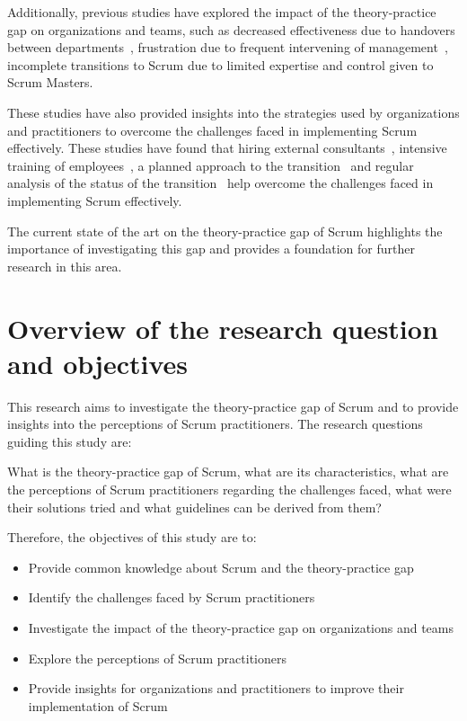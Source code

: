 Additionally, previous studies have explored the impact of the theory-practice gap on organizations and teams, such as decreased effectiveness due to handovers between departments~\cite[p.~119]{Vilkki2010Wai}, frustration due to frequent intervening of management~\cite[p.~29]{Koning2019AT}, incomplete \glspl{transition} to Scrum due to limited expertise and control given to Scrum Masters.

These studies have also provided insights into the strategies used by organizations and practitioners to overcome the challenges faced in implementing Scrum effectively. These studies have found that hiring external consultants~\cite[p.~77]{Moreira2013AtA}, intensive training of employees~\cite[p.~72]{Maximini2018ISi}, a planned approach to the \gls{transition}~\cite[p.~37]{Thorgren2019Tro} and regular analysis of the status of the \gls{transition}~\cite[p.~395]{Rubin2012ESA} help overcome the challenges faced in implementing Scrum effectively. 

The current state of the art on the theory-practice gap of Scrum highlights the importance of investigating this gap and provides a foundation for further research in this area.

\section{Overview of the research question and objectives}\label{sec:OverviewResearchQuestion}
This research aims to investigate the theory-practice gap of Scrum and to provide insights into the perceptions of Scrum practitioners. The research questions guiding this study are: 

What is the theory-practice gap of Scrum, what are its characteristics, what are the perceptions of Scrum practitioners regarding the challenges faced, what were their solutions tried and what \glspl{guideline} can be derived from them?

Therefore, the objectives of this study are to:
\begin{itemize}
    \item Provide common knowledge about Scrum and the theory-practice gap
    \item Identify the challenges faced by Scrum practitioners
    \item Investigate the impact of the theory-practice gap on organizations and teams
    \item Explore the perceptions of Scrum practitioners
    \item Provide insights for organizations and practitioners to improve their implementation of Scrum
\end{itemize}

